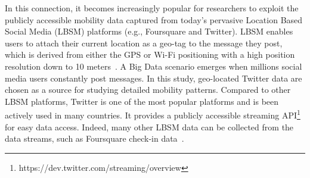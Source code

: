\documentclass[ijgi,article,accept,moreauthors,pdftex,10pt,a4paper]{mdpi}
\theoremstyle{mdpi}
\newcounter{ex}
\newcounter{re}
\theoremstyle{mdpidefinition}
\begin{document}
In this connection, it becomes increasingly popular for researchers to exploit the publicly accessible mobility data captured from today's pervasive Location Based Social Media (LBSM) platforms (e.g., Foursquare and Twitter).
LBSM enables users to attach their current location as a geo-tag to the message they post, which is derived from either the GPS or Wi-Fi positioning with a high position resolution down to 10 meters~\cite{Jurdak2015}.
A Big Data scenario emerges when millions social media users constantly post messages.
In this study, geo-located Twitter data are chosen as a source for studying detailed mobility patterns.
Compared to other LBSM platforms, Twitter is one of the most popular platforms and is been actively used in many countries.
It provides a publicly accessible streaming API\footnote{https://dev.twitter.com/streaming/overview} for easy data access.
Indeed, many other LBSM data can be collected from the data streams, such as Foursquare check-in data~\cite{cranshaw2012livehoods,hasan2013understanding}.
\end{document}
